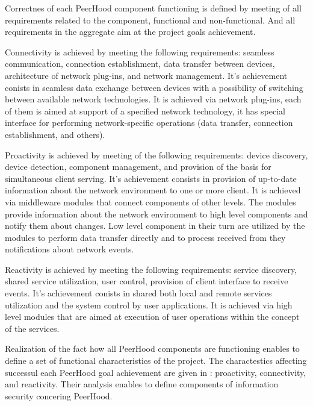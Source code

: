 
%
Correctnes of each PeerHood component functioning is defined by meeting of all requirements related to the component, functional and non-functional. 
%
And all requirements in the aggregate aim at the project goals achievement. 

%
Connectivity is achieved by meeting the following requirements: seamless communication, connection establishment, data transfer between devices, architecture of network plug-ins, and network management.
%
It's achievement conists in seamless data exchange between devices with a possibility of switching between available network technologies. 
%
It is achieved via network plug-ins, each of them is aimed at support of a specified network technology, it has special interface for performing network-specific operations (data transfer, connection establishment, and others). 

%
Proactivity is achieved by meeting of the following requirements: device discovery, device detection, component management, and provision of the basis for simultaneous client serving. 
%
It's achievement consists in provision of up-to-date information about the network environment to one or more client. 
%
It is achieved via middleware modules that connect components of other levels. 
%
The modules provide information about the network environment to high level components and notify them about changes. 
%
Low level component in their turn are utilized by the modules to perform data transfer directly and to process received from they notifications about network events. 

%
Reactivity is achieved by meeting the following requirements: service discovery, shared service utilization, user control, provision of client interface to receive events. 
%
It's achievement conists in shared both local and remote services utilization and the system control by user applications. 
%
It is achieved via high level modules that are aimed at execution of user operations within the concept of the services.

%
Realization of the fact how all PeerHood components are functioning enables to define a set of functional characteristics of the project. 
%
The charactestics affecting successul each PeerHood goal achievement are given in : proactivity, connectivity, and reactivity. 
%
Their analysis enables to define components of information security concering PeerHood. 

